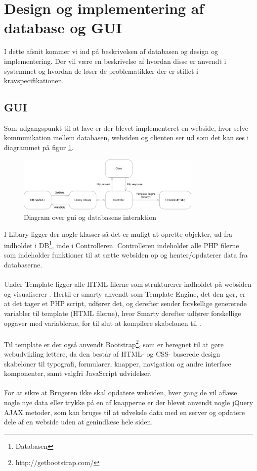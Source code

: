 \section{Design og implementering af database og GUI}
I dette afsnit kommer vi ind på beskrivelsen af databasen og  design og implementering. Der vil være en beskrivelse af hvordan disse er anvendt i systemmet og hvordan de løser de problematikker der er stillet i kravspecifikationen.\\

\subsection{GUI}
Som udgangspunkt til at lave  er der blevet implementeret en webside, hvor selve kommunikation mellem databasen, websiden og clienten ser ud som det kan ses i diagrammet på figur \ref{fig:web}.

\begin{figure}[H]
    \centering
    \includegraphics[width=0.8\textwidth]{SoftwareArkitektur/GUI/photo/webDiagram.PNG}
    \caption{Diagram over gui og databasens interaktion}
    \label{fig:web}
\end{figure}

I Libary ligger der nogle klasser så det er muligt at oprette objekter, ud fra indholdet i DB\footnote{Databasen}, inde i Controlleren. Controlleren indeholder alle PHP filerne som indeholder funktioner til at sætte websiden op og henter/opdaterer data fra databaserne.
\\\\
Under Template ligger alle HTML filerne som strukturerer indholdet på websiden og visualiserer . Hertil er smarty anvendt som Template Engine, det den gør, er at det tager et PHP script, udfører det, og derefter sender forskellige genererede variabler til template (HTML filerne), hvor Smarty derefter udfører forskellige opgaver med variablerne, for til slut at kompilere skabelonen til .
\\\\
Til template er der også anvendt Bootstrap\footnote{http://getbootstrap.com/}, som er beregnet til at gøre webudvikling lettere, da den består af HTML- og CSS- baserede design skabeloner til typografi, formularer, knapper, navigation og andre interface komponenter, samt valgfri JavaScript udvidelser.
\\\\
For at sikre at Brugeren ikke skal opdatere websiden, hver gang de vil aflæse nogle nye data eller trykke på en af knapperne er der blevet anvendt nogle jQuery AJAX metoder, som kan bruges til at udveksle data med en server og opdatere dele af en webside uden at genindlæse hele siden.

